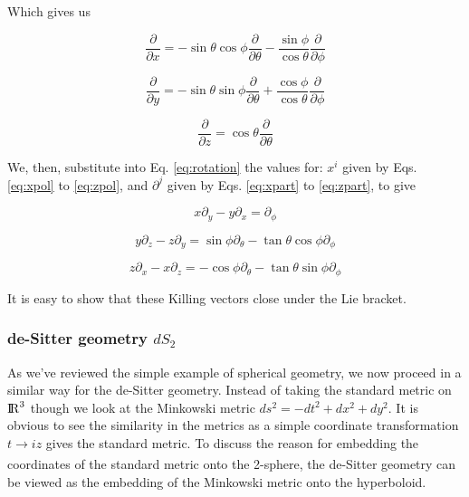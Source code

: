 \documentclass[a4paper,11pt]{article}
\numberwithin{equation}{section}
\numberwithin{figure}{section}
\begin{document}
\begin{large}
Which gives us

\begin{equation}
\label{eq:xpart}
\frac{\partial}{\partial x}=-\sin\theta\cos\phi\frac{\partial}{\partial \theta}-\frac{\sin\phi}{\cos\theta}\frac{\partial}{\partial \phi}
\end{equation}


\begin{equation}
\label{eq:ypart}
\frac{\partial}{\partial y}=-\sin\theta\sin\phi\frac{\partial}{\partial \theta}+\frac{\cos\phi}{\cos\theta}\frac{\partial}{\partial \phi}
\end{equation}


\begin{equation}
\label{eq:zpart}
\frac{\partial}{\partial z}=\cos\theta\frac{\partial}{\partial \theta}
\end{equation}


\newpage


We, then, substitute into Eq. \eqref{eq:rotation} the values for: $x^i$ given by Eqs. \eqref{eq:xpol} to \eqref{eq:zpol}, and $\partial^j$ given by Eqs. \eqref{eq:xpart} to \eqref{eq:zpart}, to give

\begin{equation}
\label{eq:xyrot}
x\partial_y-y\partial_x=\partial_\phi
\end{equation}


\begin{equation}
\label{eq:yzrot}
y\partial_z-z\partial_y=\sin\phi \partial_\theta-\tan\theta\cos\phi \partial_\phi
\end{equation}


\begin{equation}
\label{eq:zxrot}
z\partial_x-x\partial_z=-\cos\phi \partial_\theta-\tan\theta\sin\phi \partial_\phi
\end{equation}


It is easy to show that these Killing vectors close under the Lie bracket.

\subsubsection{de-Sitter geometry $dS_2$}

As we've reviewed the simple example of spherical geometry, we now proceed in a similar way for the de-Sitter geometry. Instead of taking the standard metric on ${\rm I\!R}^3$ though we look at the Minkowski metric $ds^2=-dt^2+dx^2+dy^2$. It is obvious to see the similarity in the metrics as a simple coordinate transformation $t\xrightarrow[]{}iz$ gives the standard metric. To discuss the reason for embedding the coordinates of the standard metric onto the 2-sphere, the de-Sitter geometry can be viewed as the embedding of the Minkowski metric onto the hyperboloid. 


\end{large}
\end{document}
